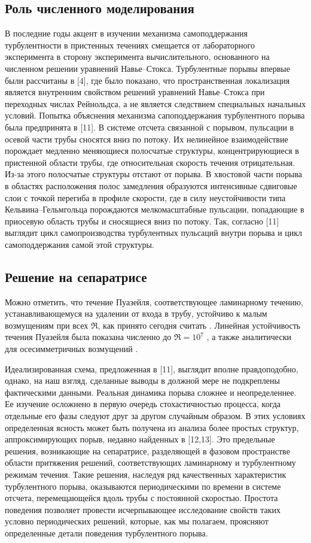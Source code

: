 	\subsection{Роль численного моделирования}

В последние годы акцент в изучении механизма самоподдержания турбулентности в пристенных течениях смещается от лабораторного эксперимента в сторону эксперимента вычислительного, основанного на численном решении уравнений Навье--Стокса. Турбулентные порывы впервые были рассчитаны в [4], где было показано, что пространственная локализация является внутренним свойством решений уравнений Навье--Стокса при переходных числах Рейнольдса, а не является следствием специальных начальных условий. Попытка объяснения механизма сапоподдержания турбулентного порыва была предпринята в [11]. В системе отсчета связанной с порывом, пульсации в осевой части трубы сносятся вниз по потоку. Их нелинейное взаимодействие порождает медленно меняющиеся полосчатые структуры, концентрирующиеся в пристенной области трубы, где относительная скорость течения отрицательная. Из-за этого полосчатые структуры отстают от порыва. В хвостовой части порыва в областях расположения полос замедления образуются интенсивные сдвиговые слои с точкой перегиба в профиле скорости, где в силу неустойчивости типа Кельвина--Гельмгольца порождаются мелкомасштабные пульсации, попадающие в приосевую область трубы и сносящиеся вниз по потоку. Так, согласно [11] выглядит цикл самопроизводства турбулентных пульсаций внутри порыва и цикл самоподдержания самой этой структуры.


	\subsection{Решение на сепаратрисе}


Можно отметить, что течение Пуазейля, соответствующее ламинарному течению, устанавливающемуся на удалении от входа в трубу, устойчиво к малым возмущениям при всех $\Re$, как принято сегодня считать \cite{Kerswell2005}. Линейная устойчивость течения Пуазейля была показана численно до $\Re=10^7$ \cite{Meseguer2003}, а также аналитически для осесимметричных возмущений \cite{Salwen1980}. 

Идеализированная схема, предложенная в [11], выглядит вполне правдоподобно, однако, на наш взгляд, сделанные выводы в должной мере не подкреплены фактическими данными. Реальная динамика порыва сложнее и неопределеннее. Ее изучение осложнено в первую очередь стохастичностью процесса, когда отдельные его фазы следуют друг за другом случайным образом. В этих условиях определенная ясность может быть получена из анализа более простых структур, аппроксимирующих порыв, недавно найденных в [12,13]. Это предельные решения, возникающие на сепаратрисе, разделяющей в фазовом пространстве области притяжения решений, соответствующих ламинарному и турбулентному режимам течения. Такие решения, наследуя ряд качественных характеристик турбулентного порыва, оказываются периодическими по времени в системе отсчета, перемещающейся вдоль трубы с постоянной скоростью. Простота поведения позволяет провести исчерпывающее исследование свойств таких условно периодических решений, которые, как мы полагаем, проясняют определенные детали поведения турбулентного порыва.

